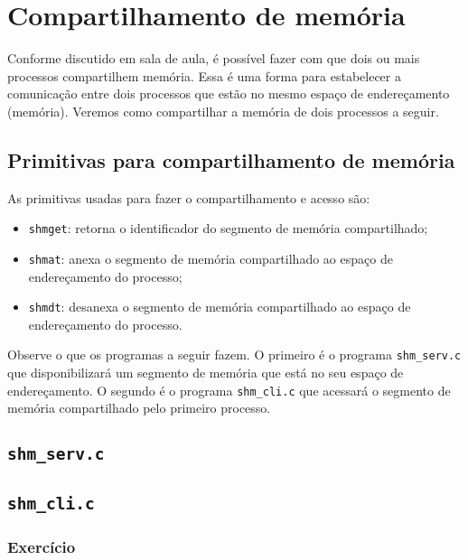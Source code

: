 \chapter{Compartilhamento de memória}

Conforme discutido em sala de aula, é possível fazer com que dois ou mais processos compartilhem memória. Essa é uma forma para estabelecer a comunicação entre dois processos que estão no mesmo espaço de endereçamento (memória). Veremos como compartilhar a memória de dois processos a seguir.

\section{Primitivas para compartilhamento de memória}
As primitivas usadas para fazer o compartilhamento e acesso são:
\begin{itemize}
\setlength{\itemsep}{1pt}\setlength{\parskip}{0pt}  \setlength{\parsep}{0pt}
\item \texttt{shmget}: retorna o identificador do segmento de memória compartilhado;
\item \texttt{shmat}: anexa o segmento de memória compartilhado ao espaço de endereçamento do processo;
\item \texttt{shmdt}: desanexa o segmento de memória compartilhado ao espaço de endereçamento do processo.
\end{itemize}

Observe o que os programas a seguir fazem. O primeiro é o programa \texttt{shm\_serv.c} que disponibilizará um segmento de memória que está no seu espaço de endereçamento. O segundo é o programa \texttt{shm\_cli.c} que acessará o segmento de memória compartilhado pelo primeiro processo.

\clearpage

\section*{\texttt{shm\_serv.c}}



\section*{\texttt{shm\_cli.c}}


\subsection{Exercício}


